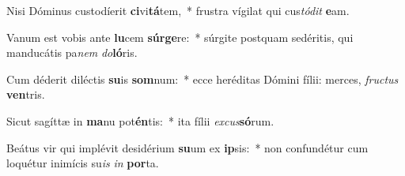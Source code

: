 \item Nisi Dóminus custodíerit \textbf{ci}vi\textbf{tá}tem,~* frustra vígilat qui cus\textit{tó}\textit{dit} \textbf{e}am.
\item Vanum est vobis ante \textbf{lu}cem \textbf{súr}\textbf{ge}re:~* súrgite postquam sedéritis, qui manducátis pa\textit{nem} \textit{do}\textbf{ló}ris.
\item Cum déderit diléctis \textbf{su}is \textbf{som}num:~* ecce heréditas Dómini fílii: merces, \textit{fruc}\textit{tus} \textbf{ven}tris.
\item Sicut sagíttæ in \textbf{ma}nu pot\textbf{én}tis:~* ita fílii \textit{ex}\textit{cus}\textbf{só}rum.
\item Beátus vir qui implévit desidérium \textbf{su}um ex \textbf{ip}sis:~* non confundétur cum loquétur inimícis su\textit{is} \textit{in} \textbf{por}ta.
